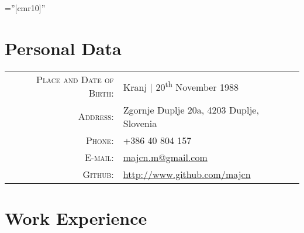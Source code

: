 \documentclass[a4paper,10pt]{article} %
\begin{document}
\pagestyle{empty} %

\font\fb=''[cmr10]'' %


\par{\bigskip\par} %

\section{Personal Data}

\begin{tabular}{rl}
\textsc{Place and Date of Birth:} & Kranj | 20\textsuperscript{th} November 1988 \\
\textsc{Address:} & Zgornje Duplje 20a, 4203 Duplje, Slovenia \\
\textsc{Phone:} & +386 40 804 157\\
\textsc{E-mail:} & \href{mailto:majcn.m@gmail.com}{majcn.m@gmail.com} \\
\textsc{Github:} & \href{http://www.github.com/majcn}{http://www.github.com/majcn} \\
\end{tabular}


\section{Work Experience}
\end{document}
